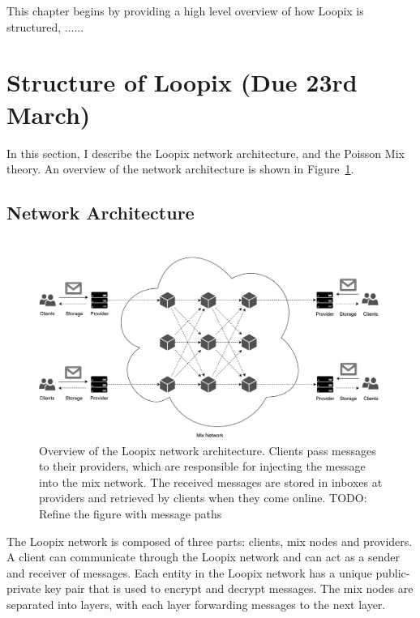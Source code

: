 \documentclass[12pt,a4paper,twoside,openright]{report}
\begin{document}

This chapter begins by providing a high level overview of how Loopix is structured, ......

\section{Structure of Loopix (Due 23rd March)}

In this section, I describe the Loopix network architecture, and the Poisson Mix theory. An overview of the network architecture is shown in Figure~\ref{fig:loopix_network}. 

\subsection{Network Architecture}

\begin{figure}[h]
	\includegraphics[width=\linewidth]{figs/loopix_network}
	\caption{Overview of the Loopix network architecture. Clients pass messages to their providers, which are responsible for injecting the message into the mix network. The received messages are stored in inboxes at providers and retrieved by clients when they come online. TODO: Refine the figure with message paths }\label{fig:loopix_network}
\end{figure}

The Loopix network is composed of three parts: clients, mix nodes and providers. A client can communicate through the Loopix network and can act as a sender and receiver of messages. Each entity in the Loopix network has a unique public-private key pair that is used to encrypt and decrypt messages. The mix nodes are separated into layers, with each layer forwarding messages to the next layer. 
\end{document}
